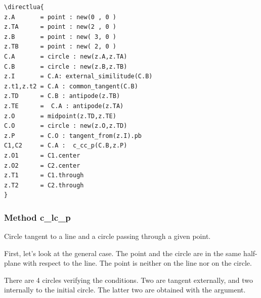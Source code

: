 \vspace{6pt}
\begin{minipage}{0.5\textwidth}
\begin{Verbatim}
\directlua{
z.A       = point : new(0 , 0 )
z.TA      = point : new(2 , 0 )
z.B       = point : new( 3, 0 )
z.TB      = point : new( 2, 0 )
C.A       = circle : new(z.A,z.TA)
C.B       = circle : new(z.B,z.TB)
z.I       = C.A: external_similitude(C.B)
z.t1,z.t2 = C.A : common_tangent(C.B)
z.TD      = C.B : antipode(z.TB)
z.TE      =  C.A : antipode(z.TA)
z.O       = midpoint(z.TD,z.TE)
C.O       = circle : new(z.O,z.TD)
z.P       = C.O : tangent_from(z.I).pb
C1,C2     = C.A :  c_cc_p(C.B,z.P)
z.O1      = C1.center
z.O2      = C2.center
z.T1      = C1.through
z.T2      = C2.through
}   
\end{Verbatim}
\end{minipage}
\begin{minipage}{0.5\textwidth}
\end{minipage}

\subsubsection{Method c\_lc\_p} %
\label{ssub:method_c_lc_p}

Circle tangent to a line and a circle passing through a given point.

First, let's look at the general case. The point and the circle are in the same half-plane with respect to the line.
The point is neither on the line nor on the circle.

There are 4 circles verifying the conditions. Two are tangent externally, and two internally to the initial circle. The latter two are obtained with the  argument.

